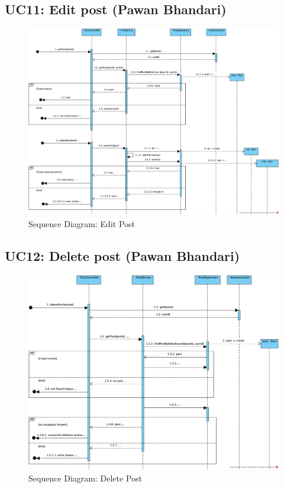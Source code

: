 \documentclass{article}
\begin{document}
\subsection{UC11: Edit post (Pawan Bhandari)}
\begin{figure}[H]
    \centering
    \includegraphics[width=.98\textwidth]{images/SD - UC11 - Edit Post.png}
    \centering
    \caption{Sequence Diagram: Edit Post}
\end{figure}
\subsection{UC12: Delete post (Pawan Bhandari)}
\begin{figure}[H]
    \centering
    \includegraphics[width=.98\textwidth]{images/SD - UC12 - Delete Post.png}
    \centering
    \caption{Sequence Diagram: Delete Post}
\end{figure}
\end{document}
